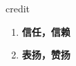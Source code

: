 
\begin{frame}
{\huge credit}
\begin{center}
\begin{enumerate}\Large
  \item \textbf{信任，信赖}
  \item \textbf{表扬，赞扬}
\end{enumerate}
\end{center}
\end{frame}
